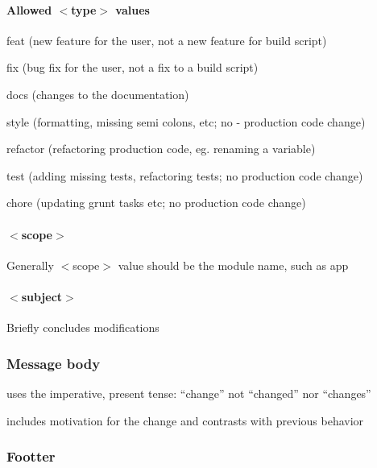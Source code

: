 \paragraph*{Allowed $<$type$>$ values}


\begin{DoxyItemize}
\item feat (new feature for the user, not a new feature for build script)
\item fix (bug fix for the user, not a fix to a build script)
\item docs (changes to the documentation)
\item style (formatting, missing semi colons, etc; no -\/ production code change)
\item refactor (refactoring production code, eg. renaming a variable)
\item test (adding missing tests, refactoring tests; no production code change)
\item chore (updating grunt tasks etc; no production code change)
\end{DoxyItemize}

\paragraph*{$<$scope$>$}

Generally {\ttfamily $<$scope$>$} value should be the module name, such as {\ttfamily app}

\paragraph*{$<$subject$>$}

Briefly concludes modifications

\subsubsection*{Message body}


\begin{DoxyItemize}
\item uses the imperative, present tense\+: “change” not “changed” nor “changes”
\item includes motivation for the change and contrasts with previous behavior
\end{DoxyItemize}

\subsubsection*{Footter}

